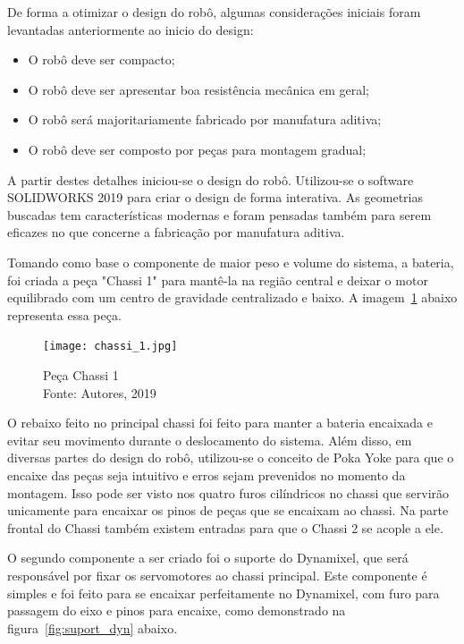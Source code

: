 De forma a otimizar o design do robô, algumas considerações iniciais foram levantadas anteriormente ao inicio do design:

\begin{itemize}
	\item O robô deve ser compacto;
	\item O robô deve ser apresentar boa resistência mecânica em geral;
	\item O robô será majoritariamente fabricado por manufatura aditiva;
	\item O robô deve ser composto por peças para montagem gradual;
\end{itemize}
A partir destes detalhes iniciou-se o design do robô. Utilizou-se o software SOLIDWORKS 2019 para criar o design de forma interativa. As geometrias buscadas tem características modernas e foram pensadas também para serem eficazes no que concerne a fabricação por manufatura aditiva.

Tomando como base o componente de maior peso e volume do sistema, a bateria, foi criada a peça "Chassi 1" para mantê-la na região central e deixar o motor equilibrado com um centro de gravidade centralizado e baixo. A imagem~\ref{fig:chassi_1} abaixo representa essa peça.

\begin{figure}[h!]
	\centering
	\texttt{[image: chassi\_1.jpg]}\\
	\caption{Peça Chassi 1 \\ Fonte: Autores, 2019}
	\label{fig:chassi_1}
\end{figure}

O rebaixo feito no principal chassi foi feito para manter a bateria encaixada e evitar seu movimento durante o deslocamento do sistema. Além disso, em diversas partes do design do robô, utilizou-se o conceito de Poka Yoke para que o encaixe das peças seja intuitivo e erros sejam prevenidos no momento da montagem. Isso pode ser visto nos quatro furos cilíndricos no chassi que servirão unicamente para encaixar os pinos de peças que se encaixam ao chassi. Na parte frontal do Chassi também existem entradas para que o Chassi 2 se acople a ele.

O segundo componente a ser criado foi o suporte do Dynamixel, que será responsável por fixar os servomotores ao chassi principal. Este componente é simples e foi feito para se encaixar perfeitamente no Dynamixel, com furo para passagem do eixo e pinos
para encaixe, como demonstrado na figura~\ref{fig:suport_dyn} abaixo.

